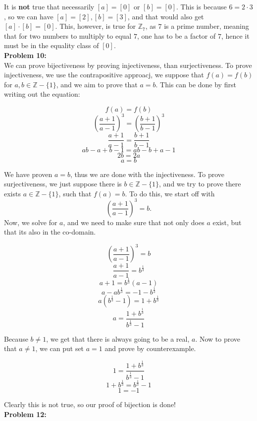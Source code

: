 \documentclass[12pt]{article}
\begin{document}
\noindent
It is \textbf{not} true that necessarily $[a]=[0]$ or $[b]=[0]$. This is because $6 = 2 \cdot 3$,
so we can have $[a] = [2], [b] = [3]$, and that would also get  $[a]\cdot[b] = [0]$. This, however, 
is true for $\mathbb{Z}_7$, as $7$ is a prime number, meaning that for two numbers to multiply to 
equal $7$, one has to be a factor of $7$, hence it must be in the equality class of $[0]$. \\

\noindent
\textbf{Problem 10: }\\
	
\noindent
We can prove bijectiveness by proving injectiveness, than surjectiveness. To prove 
injectiveness, we use the contrapositive approacj, we suppose that $f(a)=f(b)$ for $a,b \in \mathbb{Z}-\{1\}$, 
and we aim to prove that $a = b$. This can be done by first writing out the equation:
\begin{center}
	$$f(a) = f(b) $$
	$$\left(\frac{a+1}{a-1}\right)^3 = \left(\frac{b+1}{b-1}\right)^3$$
	$$\frac{a+1}{a-1} = \frac{b+1}{b-1}$$
	$$ab-a+b-1 = ab-b+a-1$$
	$$2b = 2a$$
	$$a=b$$
\end{center}
We have proven $a = b$, thus we are done with the injectiveness. To prove surjectiveness, we just
suppose there is  $b \in \mathbb{Z}-\{1\}$, and we try to prove there exists  $a \in \mathbb{Z}-\{1\}$,
such that $f(a) = b$. To do this, we start off with 
\[
\left(\frac{a+1}{a-1}\right)^3 = b
.\]
Now, we solve for $a$, and we need to make sure that not only does $a$ exist, but that its also in 
the co-domain.
\begin{center}
	$$\left(\frac{a+1}{a-1}\right)^3 = b$$
	$$\frac{a+1}{a-1} = b^{\frac{1}{3}}$$
	$$a+1=b^{\frac{1}{3}}(a-1)$$
	$$a-ab^{\frac{1}{3}} = -1-b^{\frac{1}{3}}$$ 
	$$a(b^{\frac{1}{3}}-1) = 1+b^{\frac{1}{3}}$$
	$$a = \frac{1+b^{\frac{1}{3}}}{b^{\frac{1}{3}}-1}$$
\end{center}
Because $b \neq 1$, we get that there is always going to be a real, $a$.
Now to prove that  $a \neq 1$, we can put set $a = 1$ and prove by counterexample.
\begin{center}
	$$1 = \frac{1+b^{\frac{1}{3}}}{b^{\frac{1}{3}}-1}$$
	$$1+b^{\frac{1}{3}} = b^{\frac{1}{3}}-1$$
	$$1 = -1$$
\end{center}
Clearly this is not true, so our proof of bijection is done!\\

\noindent
\textbf{Problem 12: }\\
\end{document}
